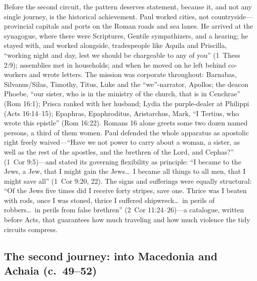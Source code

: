 Before the second circuit, the pattern deserves statement, because it, and
not any single journey, is the historical achievement. Paul worked cities,
not countryside---provincial capitals and ports on the Roman roads and sea
lanes. He arrived at the synagogue, where there were Scriptures, Gentile
sympathizers, and a hearing; he stayed with, and worked alongside,
tradespeople like Aquila and Priscilla, ``working night and day, lest we
should be chargeable to any of you'' (1~Thess 2:9); assemblies met in
households; and when he moved on he left behind co-workers and wrote
letters. The mission was corporate throughout: Barnabas, Silvanus/Silas,
Timothy, Titus, Luke and the ``we''-narrator, Apollos; the deacon Phoebe,
``our sister, who is in the ministry of the church, that is in Cenchrae''
(Rom 16:1); Prisca ranked with her husband; Lydia the purple-dealer at
Philippi (Acts 16:14--15); Epaphras, Epaphroditus, Aristarchus, Mark,
``I Tertius, who wrote this epistle'' (Rom 16:22). Romans 16 alone greets
some two dozen named persons, a third of them women. Paul defended the
whole apparatus as apostolic right freely waived---``Have we not power to
carry about a woman, a sister, as well as the rest of the apostles, and
the brethren of the Lord, and Cephas?'' (1~Cor 9:5)---and stated its
governing flexibility as principle: ``I became to the Jews, a Jew, that I
might gain the Jews\ldots\ I became all things to all men, that I might
save all'' (1~Cor 9:20, 22). The signs and
sufferings were equally structural: ``Of the Jews five times did I receive
forty stripes, save one. Thrice was I beaten with rods, once I was stoned,
thrice I suffered shipwreck\ldots\ in perils of robbers\ldots\ in perils
from false brethren'' (2~Cor 11:24--26)---a catalogue, written before
Acts, that guarantees how much traveling and how much violence the tidy
circuits compress.

\subsection{The second journey: into Macedonia and Achaia (c.~49--52)}

